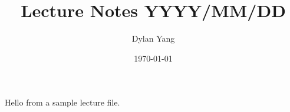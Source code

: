 \documentclass[../main.tex]{subfiles}
\title{Lecture Notes YYYY/MM/DD}
\author{Dylan Yang}
\date{\today}
\begin{document}
\makeatletter
{}
\makeatother

Hello from a sample lecture file.
\end{document}
